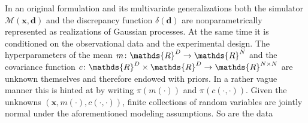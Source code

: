 In an original formulation \cite{Bayesian:Kennedy2001,Kriging:Higdon2004,Kriging:Higdon2015} and its multivariate generalizations \cite{Bayesian:Higdon2008:a,Bayesian:Higdon2008:b}
both the simulator \(\mathcal{M}(\bm{x},\bm{d})\) and the discrepancy function \(\delta(\bm{d})\) are nonparametrically represented as realizations of Gaussian processes.
At the same time it is conditioned on the observational data and the experimental design.
The hyperparameters of the mean \(m \colon \mathds{R}^\dimControl \rightarrow \mathds{R}^\dimData\) and the covariance function
\(c \colon \mathds{R}^\dimControl \times \mathds{R}^\dimControl \rightarrow \mathds{R}^{\dimData \times \dimData}\) are unknown themselves and therefore endowed with priors.
In a rather vague manner this is hinted at by writing \(\pi(m(\cdot))\) and \(\pi(c(\cdot,\cdot))\).
Given the unknowns \((\bm{x},m(\cdot),c(\cdot,\cdot))\), finite collections of random variables are jointly normal under the aforementioned modeling assumptions.
So are the data
